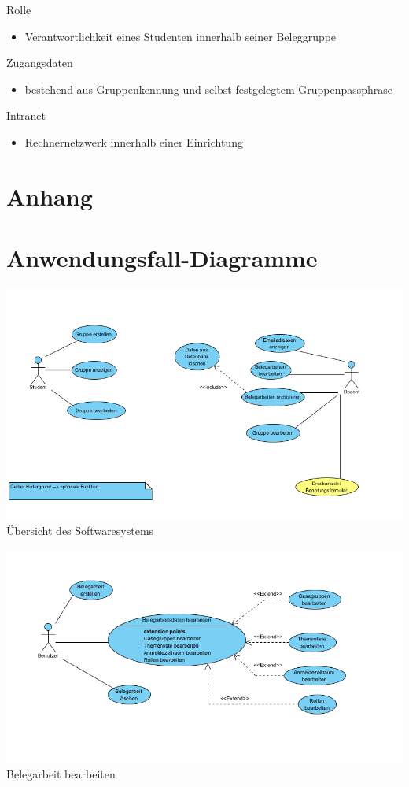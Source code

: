 \documentclass{article}
\begin{document}
Rolle
\begin{itemize} 
\item Verantwortlichkeit eines Studenten innerhalb seiner Beleggruppe
\end{itemize}

Zugangsdaten
\begin{itemize} 
\item bestehend aus Gruppenkennung und selbst festgelegtem Gruppenpassphrase
\end{itemize}

Intranet
\begin{itemize} 
\item Rechnernetzwerk innerhalb einer Einrichtung
\end{itemize}
\section{Anhang}
\appendix
\section{Anwendungsfall-Diagramme}

\includegraphics[scale=0.8]{bilder/Uebersicht_UseCase.PNG}
Übersicht des Softwaresystems

\includegraphics[scale=1]{bilder/Belegarbeit_bearbeiten_UseCase.png}
Belegarbeit bearbeiten
\end{document}
